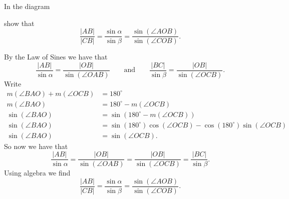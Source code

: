 \documentclass[newpage,hints,handout]{ximera}
\begin{document}
\begin{problem}\label{46}
In the diagram
\begin{image}
\end{image}
show that
\[
\frac{\left\vert AB\right\vert }{\left\vert CB\right\vert }=\frac
{\sin\alpha}{\sin\beta}=\frac{\sin\left(  \angle
AOB\right)  }{\sin\left(  \angle COB\right)  }.
\]


\begin{freeResponse}
By the Law of Sines we have that
\[
\frac{|AB|}{\sin\alpha} = \frac{|OB|}{\sin(\angle OAB)}\qquad\text{and}\qquad\frac{|BC|}{\sin\beta} = \frac{|OB|}{\sin(\angle OCB)}.
\]
Write 
\begin{align*}
m\left(  \angle BAO\right)  +m\left(\angle OCB\right)  &=180^{\circ}\\
m\left(  \angle BAO\right)  &=180^{\circ}-m\left(\angle OCB\right)  \\
\sin\left(\angle BAO\right)  &=\sin\left(180^{\circ}-m\left(\angle OCB\right)\right)  \\
\sin\left(\angle BAO\right)  &=\sin\left(180^{\circ}\right)\cos\left(\angle OCB\right) - \cos\left(180^{\circ}\right)\sin\left(\angle OCB\right)\\ 
\sin\left(\angle BAO\right)  &=\sin\left(\angle OCB\right).
\end{align*}
So  now we have that 
\[
\frac{|AB|}{\sin\alpha} = \frac{|OB|}{\sin(\angle OAB)}= \frac{|OB|}{\sin(\angle OCB)}=\frac{|BC|}{\sin\beta}. 
\]
Using algebra we find 
\[
\frac{\left\vert AB\right\vert }{\left\vert CB\right\vert }=\frac
{\sin\alpha}{\sin\beta}=\frac{\sin\left(  \angle
AOB\right)  }{\sin\left(  \angle COB\right)  }.
\]
\end{freeResponse}
\end{problem}
\end{document}
